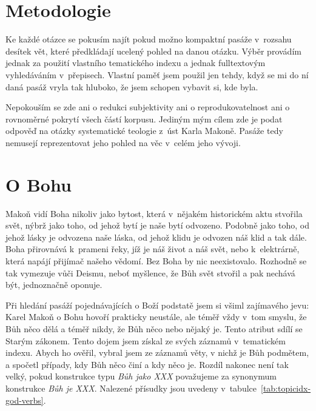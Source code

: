 \section{Metodologie}

Ke každé otázce se pokusím najít pokud možno kompaktní pasáže v~rozsahu desítek
vět, které předkládají ucelený pohled na danou otázku. Výběr provádím jednak za
použití vlastního tematického indexu a jednak fulltextovým vyhledáváním
v~přepisech. Vlastní paměť jsem použil jen tehdy, když se mi do ní daná pasáž
vryla tak hluboko, že jsem schopen vybavit si, kde byla.

Nepokouším se zde ani o redukci subjektivity ani o reprodukovatelnost ani o
rovnoměrné pokrytí všech částí korpusu. Jediným mým cílem zde je podat odpověď
na otázky systematické teologie z~úst Karla Makoně. Pasáže tedy nemusejí
reprezentovat jeho pohled na věc v~celém jeho vývoji.

\section{O Bohu}
\label{teol:o-bohu}

Makoň vidí Boha nikoliv jako bytost, která v~nějakém historickém aktu stvořila
svět, nýbrž jako toho, od jehož bytí je naše bytí odvozeno. Podobně jako toho,
od jehož lásky je odvozena naše láska, od jehož klidu je odvozen náš klid a tak
dále. Boha přirovnává k~prameni řeky, jíž je náš život a náš svět, nebo
k~elektrárně, která napájí přijímač našeho vědomí. Bez Boha by nic neexistovalo.
Rozhodně se tak vymezuje vůči Deismu, neboť myšlence, že Bůh svět stvořil a pak
nechává být, jednoznačně oponuje.

Při hledání pasáží pojednávajících o Boží podstatě jsem si všiml zajímavého
jevu: Karel Makoň o Bohu hovoří prakticky neustále, ale téměř vždy v~tom smyslu,
že Bůh něco dělá a téměř nikdy, že Bůh něco nebo nějaký je. Tento atribut sdílí
se Starým zákonem\cite{brueggemann2010old}. Tento dojem jsem získal ze svých
záznamů v~tematickém indexu. Abych ho ověřil, vybral jsem ze záznamů věty, v nichž je
Bůh podmětem, a spočetl případy, kdy Bůh něco činí a kdy něco je. Rozdíl nakonec
není tak velký, pokud konstrukce typu \textit{Bůh jako XXX} považujeme za
synonymum konstrukce \textit{Bůh je XXX}. Nalezené přísudky jsou uvedeny
v~tabulce~\ref{tab:topicidx-god-verbs}.

